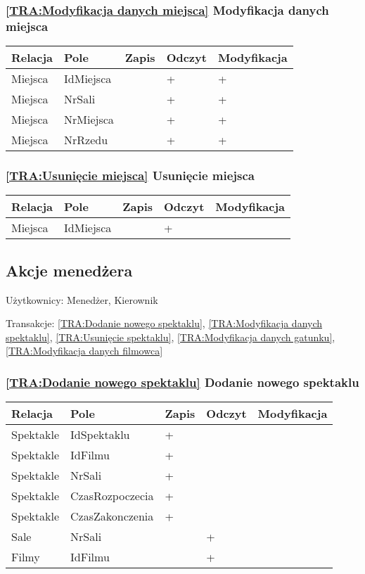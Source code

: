 \subsubsection*{\ref{TRA:Modyfikacja danych miejsca} Modyfikacja danych miejsca}
\begin{tabularx}{\textwidth}{|Y|Y|Y|Y|Y|}\hline
Relacja & Pole & Zapis & Odczyt & Modyfikacja \\\hline
Miejsca & IdMiejsca &  & + & +\\
Miejsca & NrSali &  & + & +\\
Miejsca & NrMiejsca &  & + & +\\
Miejsca & NrRzedu &  & + & +\\
\hline\end{tabularx}
\subsubsection*{\ref{TRA:Usunięcie miejsca} Usunięcie miejsca}
\begin{tabularx}{\textwidth}{|Y|Y|Y|Y|Y|}\hline
Relacja & Pole & Zapis & Odczyt & Modyfikacja \\\hline
Miejsca & IdMiejsca &  & + & \\
\hline\end{tabularx}
\subsection{Akcje menedżera}
Użytkownicy: Menedżer, Kierownik

Transakcje: \ref{TRA:Dodanie nowego spektaklu}, \ref{TRA:Modyfikacja danych spektaklu}, \ref{TRA:Usunięcie spektaklu}, \ref{TRA:Modyfikacja danych gatunku}, \ref{TRA:Modyfikacja danych filmowca}
\subsubsection*{\ref{TRA:Dodanie nowego spektaklu} Dodanie nowego spektaklu}
\begin{tabularx}{\textwidth}{|Y|Y|Y|Y|Y|}\hline
Relacja & Pole & Zapis & Odczyt & Modyfikacja \\\hline
Spektakle & IdSpektaklu & + &  & \\
Spektakle & IdFilmu & + &  & \\
Spektakle & NrSali & + &  & \\
Spektakle & CzasRozpoczecia & + &  & \\
Spektakle & CzasZakonczenia & + &  & \\
Sale & NrSali &  & + & \\
Filmy & IdFilmu &  & + & \\
\hline\end{tabularx}
